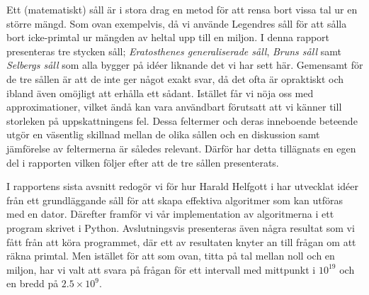 Ett (matematiskt) såll är i stora drag en metod för att rensa bort vissa tal ur en större mängd.
Som ovan exempelvis, då vi använde Legendres såll för att sålla bort icke-primtal ur mängden av heltal upp till en miljon.
I denna rapport presenteras tre stycken såll;
\textit{Eratosthenes generaliserade såll}, \textit{Bruns såll} samt \textit{Selbergs såll} som alla bygger på idéer liknande det vi har sett här.
Gemensamt för de tre sållen är att de inte ger något exakt svar, då det ofta är opraktiskt och ibland även omöjligt att erhålla ett sådant.
Istället får vi nöja oss med approximationer, vilket ändå kan vara användbart förutsatt att vi känner till storleken på uppskattningens fel.
Dessa feltermer och deras inneboende beteende utgör en väsentlig skillnad mellan de olika sållen och en diskussion samt jämförelse av feltermerna är således relevant. Därför har detta tillägnats en egen del i rapporten vilken följer efter att de tre sållen presenterats.


I rapportens sista avsnitt redogör vi för hur Harald Helfgott i \cite{HaraldSieve} har utvecklat idéer från ett grundläggande såll för att skapa effektiva algoritmer som kan utföras med en dator. 
Därefter framför vi vår implementation av algoritmerna i ett program skrivet i Python.
Avslutningsvis presenteras även några resultat som vi fått från att köra programmet,
där ett av resultaten knyter an till frågan om att räkna primtal.
Men istället för att som ovan, titta på tal mellan noll och en miljon, har vi valt att svara på frågan för ett intervall med mittpunkt i $10^{19}$ och en bredd på $2.5\times10^9$.